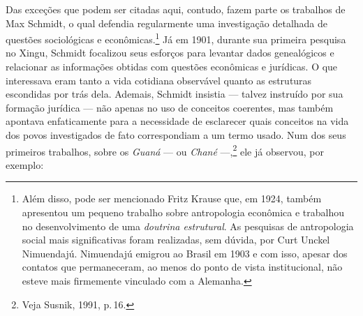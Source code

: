 Das exceções que podem ser citadas aqui, contudo, fazem parte os
trabalhos de Max Schmidt, o qual defendia regularmente uma investigação
detalhada de questões sociológicas e econômicas.\footnote{Além disso,
  pode ser mencionado Fritz Krause que, em 1924, também apresentou um
  pequeno trabalho sobre antropologia econômica e trabalhou no
  desenvolvimento de uma \textit{doutrina estrutural}. As
  pesquisas de antropologia social mais significativas foram realizadas,
  sem dúvida, por Curt Unckel Nimuendajú. Nimuendajú
  emigrou ao Brasil em 1903 e com isso, apesar dos contatos que
  permaneceram, ao menos do ponto de vista institucional, não esteve
  mais firmemente vinculado com a Alemanha.} Já em 1901, durante sua
primeira pesquisa no Xingu, Schmidt focalizou seus esforços para
levantar dados genealógicos e relacionar as informações obtidas com
questões econômicas e jurídicas. O que interessava eram tanto a vida
cotidiana observável quanto as estruturas escondidas por trás dela.
Ademais, Schmidt insistia --- talvez instruído por sua formação jurídica
--- não apenas no uso de conceitos coerentes, mas também apontava
enfaticamente para a necessidade de esclarecer quais conceitos na vida
dos povos investigados de fato correspondiam a um termo usado. Num dos
seus primeiros trabalhos, sobre os \textit{Guaná} --- ou \textit{Chané} ---,\footnote{Veja
  Susnik, 1991, p.\,16.} ele já observou, por exemplo:

